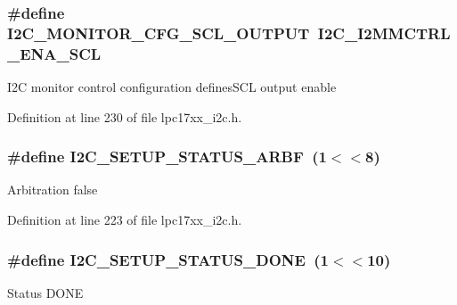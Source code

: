 \subsubsection[{\texorpdfstring{I2\+C\+\_\+\+M\+O\+N\+I\+T\+O\+R\+\_\+\+C\+F\+G\+\_\+\+S\+C\+L\+\_\+\+O\+U\+T\+P\+UT}{I2C_MONITOR_CFG_SCL_OUTPUT}}]{\setlength{\rightskip}{0pt plus 5cm}\#define I2\+C\+\_\+\+M\+O\+N\+I\+T\+O\+R\+\_\+\+C\+F\+G\+\_\+\+S\+C\+L\+\_\+\+O\+U\+T\+P\+UT~{\bf I2\+C\+\_\+\+I2\+M\+M\+C\+T\+R\+L\+\_\+\+E\+N\+A\+\_\+\+S\+CL}}\hypertarget{group___i2_c___private___macros_ga5f79529ae357b8aa86e6ead24d95167e}{}\label{group___i2_c___private___macros_ga5f79529ae357b8aa86e6ead24d95167e}
I2C monitor control configuration defines\+S\+CL output enable 

Definition at line 230 of file lpc17xx\+\_\+i2c.\+h.

\subsubsection[{\texorpdfstring{I2\+C\+\_\+\+S\+E\+T\+U\+P\+\_\+\+S\+T\+A\+T\+U\+S\+\_\+\+A\+R\+BF}{I2C_SETUP_STATUS_ARBF}}]{\setlength{\rightskip}{0pt plus 5cm}\#define I2\+C\+\_\+\+S\+E\+T\+U\+P\+\_\+\+S\+T\+A\+T\+U\+S\+\_\+\+A\+R\+BF~(1$<$$<$8)}\hypertarget{group___i2_c___private___macros_gae90c077796281121b65b80b661a23062}{}\label{group___i2_c___private___macros_gae90c077796281121b65b80b661a23062}
Arbitration false 

Definition at line 223 of file lpc17xx\+\_\+i2c.\+h.

\subsubsection[{\texorpdfstring{I2\+C\+\_\+\+S\+E\+T\+U\+P\+\_\+\+S\+T\+A\+T\+U\+S\+\_\+\+D\+O\+NE}{I2C_SETUP_STATUS_DONE}}]{\setlength{\rightskip}{0pt plus 5cm}\#define I2\+C\+\_\+\+S\+E\+T\+U\+P\+\_\+\+S\+T\+A\+T\+U\+S\+\_\+\+D\+O\+NE~(1$<$$<$10)}\hypertarget{group___i2_c___private___macros_gaefbb25ca99e199765e7dcdd6ef343590}{}\label{group___i2_c___private___macros_gaefbb25ca99e199765e7dcdd6ef343590}
Status D\+O\+NE 

